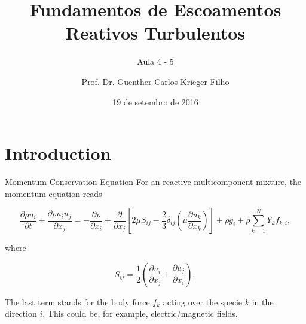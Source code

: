 \documentclass[10pt]{beamer}
\title{Fundamentos de Escoamentos Reativos Turbulentos}
\subtitle{Aula 4 - 5}
\date{19 de setembro de 2016}
\author{Prof. Dr. Guenther Carlos Krieger Filho}
\institute{Escola Politécnica da USP - LETE/CRC - Combustion Research Centre}
\begin{document}
\maketitle


\section{Introduction}

\begin{frame}{Momentum Conservation Equation}
	For an reactive multicomponent mixture, the momentum equation reads
	
	\begin{equation}
	\frac{\partial \rho u_{i}}{\partial t}+\frac{\partial \rho u_{i} u_{j}}{\partial x_{j}}=-\frac{\partial p}{\partial x_{i}}+\frac{\partial}{\partial x_{j}}\left[ 2 \mu S_{ij}-\frac{2}{3} \delta_{ij} \left( \mu \frac{\partial u_{k}}{\partial x_{k}}\right) \right] +\rho g_{i} +\rho\sum_{k=1}^N Y_{k}f_{k,i},
	\label{eq:ns1}
	\end{equation}
	
	\noindent where
	
	\begin{equation}\label{eq:deform}
	S_{ij}=\frac{1}{2}\left(\frac{\partial u_{i}}{\partial x_{j}}+\frac{\partial u_{j}}{\partial x_{i}}\right) ,
	\end{equation}
	
	The last term stands for the body force $f_{k}$ acting over the specie $k$ in the direction $i$. This could be, for example, electric/magnetic fields.
\end{frame}



\end{document}
